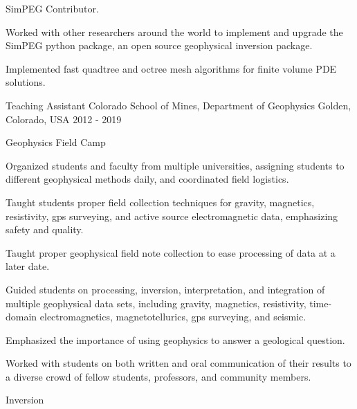 \begin{cventries}
{\begin{cvparagraph}
      SimPEG Contributor.
      \vspace{7pt}
      \end{cvparagraph}
      \begin{cvitems}
        \item {Worked with other researchers around the world to implement and upgrade the SimPEG python package, an open source geophysical inversion package.}
        \item {Implemented fast quadtree and octree mesh algorithms for finite volume PDE solutions.}
      \end{cvitems}
    }
  \cventry
    {Teaching Assistant} %
    {Colorado School of Mines, Department of Geophysics} %
    {Golden, Colorado, USA} %
    {2012 - 2019} %
    {\begin{cvparagraph}
      Geophysics Field Camp
      \vspace{7pt}
      \end{cvparagraph}
      \begin{cvitems} %
        \item {Organized students and faculty from multiple universities, assigning students to different geophysical methods daily, and coordinated field logistics.}
        \item {Taught students proper field collection techniques for gravity, magnetics, resistivity, gps surveying, and active source electromagnetic data, emphasizing safety and quality.}
        \item {Taught proper geophysical field note collection to ease processing of data at a later date.}
        \item {Guided students on processing, inversion, interpretation, and integration of multiple geophysical data sets, including gravity, magnetics, resistivity, time-domain electromagnetics, magnetotellurics, gps surveying, and seismic.}
        \item {Emphasized the importance of using geophysics to answer a geological question.}
        \item {Worked with students on both written and oral communication of their results to a diverse crowd of fellow students, professors, and community members.}
        \vspace{10pt}
      \end{cvitems}
      \begin{cvparagraph}
      \vspace{7pt}
      Inversion

\end{cvparagraph}}
\end{cventries}
